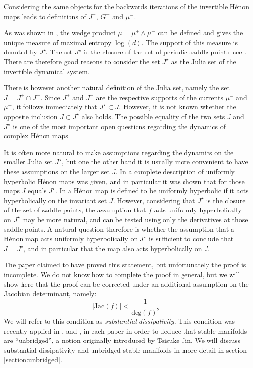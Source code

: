 \documentclass[10pt,a4paper]{article}
\begin{document}
Considering the same objects for the backwards iterations of the invertible H\'enon maps leads to definitions of $J^-$, $G^-$ and $\mu^-$.

As was shown in \cite{BS1}, the wedge product $\mu = \mu^+ \wedge \mu^-$ can be defined and gives the unique measure of maximal entropy $\log(d)$. The support of this measure is denoted by $J^\star$. The set $J^\star$ is the closure of the set of periodic saddle points, see \cite{BLS}. There are therefore good reasons to consider the set $J^\star$ as the Julia set of the invertible dynamical system.

There is however another natural definition of the Julia set, namely the set $J = J^+ \cap J^-$. Since $J^+$ and $J^-$ are the respective supports of the currents $\mu^+$ and $\mu^-$, it follows immediately that $J^\star \subset J$. However, it is not known whether the opposite inclusion $J \subset J^\star$ also holds. The possible equality of the two sets $J$ and $J^\star$ is one of the most important open questions regarding the dynamics of complex H\'enon maps.

It is often more natural to make assumptions regarding the dynamics on the smaller Julia set $J^\star$, but one the other hand it is usually more  convenient to have these assumptions on the larger set $J$. In \cite{BS1} a complete description of uniformly hyperbolic H\'enon maps was given, and in particular it was shown that for those maps $J$ equals $J^\star$. In \cite{BS1} a H\'enon map is defined to be uniformly hyperbolic if it acts hyperbolically on the invariant set $J$. However, considering that $J^\star$ is the closure of the set of saddle points, the assumption that $f$ acts uniformly hyperbolically on $J^\star$ may be more natural, and can be tested using only the derivatives at those saddle points. A natural question therefore is whether the assumption that a H\'enon map acts uniformly hyperbolically on $J^\star$ is sufficient to conclude that $J = J^\star$, and in particular that the map also acts hyperbolically on $J$.

The paper \cite{F} claimed to have proved this statement, but unfortunately the proof is incomplete. We do not know how to complete the proof in general, but we will show here that the proof can be corrected under an additional assumption on the Jacobian determinant, namely:
$$
|\mathrm{Jac}(f)| < \frac{1}{\mathrm{deg}(f)^2}.
$$
We will refer to this condition as \emph{substantial dissipativity}. This condition was recently applied in \cite{DL}, \cite{LP} and \cite{LP2}, in each paper in order to deduce that stable manifolds are ``unbridged'', a notion originally introduced by Teisuke Jin. We will discuss substantial dissipativity and unbridged stable manifolds in more detail in section \ref{section:unbridged}.
\end{document}
